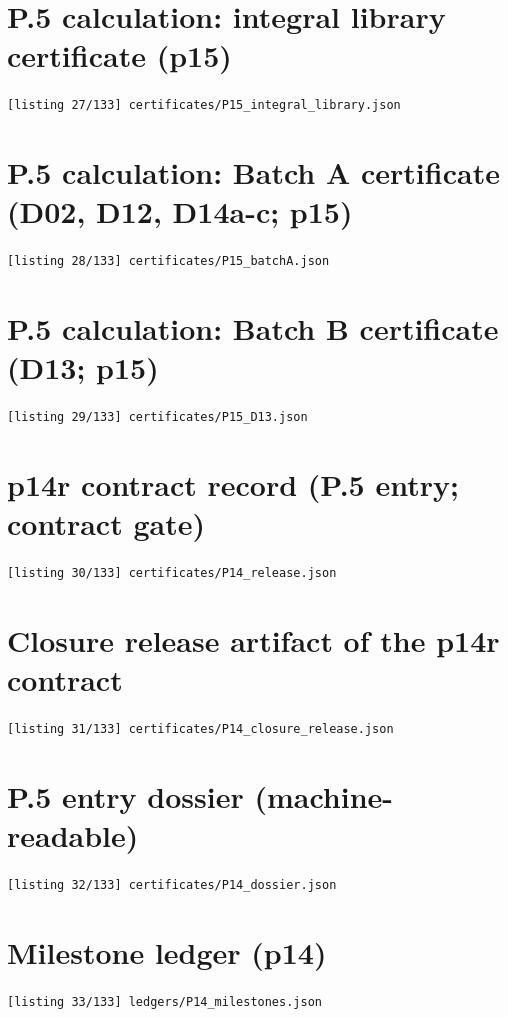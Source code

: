 \section{P.5 calculation: integral library certificate (p15)}
\noindent\texttt{[listing 27/133] certificates/P15\_integral\_library.json}
{\scriptsize}

\section{P.5 calculation: Batch A certificate (D02, D12, D14a-c; p15)}
\noindent\texttt{[listing 28/133] certificates/P15\_batchA.json}
{\scriptsize}

\section{P.5 calculation: Batch B certificate (D13; p15)}
\noindent\texttt{[listing 29/133] certificates/P15\_D13.json}
{\scriptsize}

\section{p14r contract record (P.5 entry; contract gate)}
\noindent\texttt{[listing 30/133] certificates/P14\_release.json}
{\scriptsize}

\section{Closure release artifact of the p14r contract}
\noindent\texttt{[listing 31/133] certificates/P14\_closure\_release.json}
{\scriptsize}

\section{P.5 entry dossier (machine-readable)}
\noindent\texttt{[listing 32/133] certificates/P14\_dossier.json}
{\scriptsize}

\section{Milestone ledger (p14)}
\noindent\texttt{[listing 33/133] ledgers/P14\_milestones.json}
{\scriptsize}


